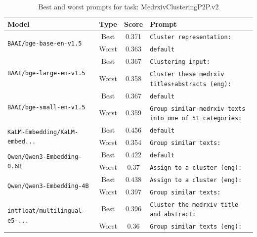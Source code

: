 \begin{table}[t]
\centering
\small
\caption{Best and worst prompts for task: MedrxivClusteringP2P.v2}
\begin{tabular}{|p{}|c|c|p{}|}
\hline
Model & Type & Score & Prompt \\
\hline
\multirow{2}{=}{\raggedright\texttt{BAAI/\allowbreak bge-\allowbreak base-\allowbreak en-\allowbreak v1.5}} & Best & 0.371 & \texttt{Cluster representation:} \\
\cline{2-4}
& Worst & 0.363 & \texttt{default} \\
\hline
\multirow{2}{=}{\raggedright\texttt{BAAI/\allowbreak bge-\allowbreak large-\allowbreak en-\allowbreak v1.5}} & Best & 0.367 & \texttt{Clustering input:} \\
\cline{2-4}
& Worst & 0.358 & \texttt{Cluster these medrxiv titles+abstracts (eng):} \\
\hline
\multirow{2}{=}{\raggedright\texttt{BAAI/\allowbreak bge-\allowbreak small-\allowbreak en-\allowbreak v1.5}} & Best & 0.367 & \texttt{default} \\
\cline{2-4}
& Worst & 0.359 & \texttt{Group similar medrxiv texts into one of 51 categories:} \\
\hline
\multirow{2}{=}{\raggedright\texttt{KaLM-\allowbreak Embedding/\allowbreak KaLM-\allowbreak embed...}} & Best & 0.456 & \texttt{default} \\
\cline{2-4}
& Worst & 0.354 & \texttt{Group similar texts:} \\
\hline
\multirow{2}{=}{\raggedright\texttt{Qwen/\allowbreak Qwen3-\allowbreak Embedding-\allowbreak 0.6B}} & Best & 0.422 & \texttt{default} \\
\cline{2-4}
& Worst & 0.37 & \texttt{Assign to a cluster (eng):} \\
\hline
\multirow{2}{=}{\raggedright\texttt{Qwen/\allowbreak Qwen3-\allowbreak Embedding-\allowbreak 4B}} & Best & 0.438 & \texttt{Assign to a cluster (eng):} \\
\cline{2-4}
& Worst & 0.397 & \texttt{Group similar texts:} \\
\hline
\multirow{2}{=}{\raggedright\texttt{intfloat/\allowbreak multilingual-\allowbreak e5-\allowbreak ...}} & Best & 0.396 & \texttt{Cluster the medrxiv title and abstract:} \\
\cline{2-4}
& Worst & 0.36 & \texttt{Group similar texts (eng):} \\
\hline
\end{tabular}
\end{table}

